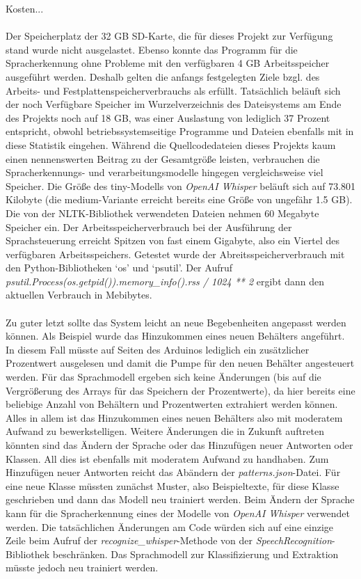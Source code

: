 Kosten...\\\\
Der Speicherplatz der 32 \ac{GB} SD-Karte, die für dieses Projekt zur Verfügung stand wurde nicht ausgelastet. Ebenso konnte das Programm für die Spracherkennung ohne Probleme mit den verfügbaren 4 \ac{GB} Arbeitsspeicher ausgeführt werden. Deshalb gelten die anfangs festgelegten Ziele bzgl. des Arbeits- und Festplattenspeicherverbrauchs als erfüllt. Tatsächlich beläuft sich der noch Verfügbare Speicher im Wurzelverzeichnis des Dateisystems am Ende des Projekts noch auf 18 \ac{GB}, was einer Auslastung von lediglich 37 Prozent entspricht, obwohl betriebssystemseitige Programme und Dateien ebenfalls mit in diese Statistik eingehen. Während die Quellcodedateien dieses Projekts kaum einen nennenswerten Beitrag zu der Gesamtgröße leisten, verbrauchen die Spracherkennungs- und verarbeitungsmodelle hingegen vergleichsweise viel Speicher. Die Größe des \glqq{}tiny\grqq{}-Modells von \textit{OpenAI Whisper} beläuft sich auf 73.801 Kilobyte (die \glqq{}medium\grqq{}-Variante erreicht bereits eine Größe von ungefähr 1.5 \ac{GB}). Die von der \ac{NLTK}-Bibliothek verwendeten Dateien nehmen 60 Megabyte Speicher ein. Der Arbeitsspeicherverbrauch bei der Ausführung der Sprachsteuerung erreicht Spitzen von fast einem Gigabyte, also ein Viertel des verfügbaren Arbeitsspeichers. Getestet wurde der Abreitsspeicherverbrauch mit den Python-Bibliotheken `os' und `psutil'. Der Aufruf \textit{psutil.Process(os.getpid()).memory\_info().rss / 1024 ** 2} ergibt dann den aktuellen Verbrauch in Mebibytes.\\\\
Zu guter letzt sollte das System leicht an neue Begebenheiten angepasst werden können. Als Beispiel wurde das Hinzukommen eines neuen Behälters angeführt. In diesem Fall müsste auf Seiten des Arduinos lediglich ein zusätzlicher Prozentwert ausgelesen und damit die Pumpe für den neuen Behälter angesteuert werden. Für das Sprachmodell ergeben sich keine Änderungen (bis auf die Vergrößerung des Arrays für das Speichern der Prozentwerte), da hier bereits eine beliebige Anzahl von Behältern und Prozentwerten extrahiert werden können. Alles in allem ist das Hinzukommen eines neuen Behälters also mit moderatem Aufwand zu bewerkstelligen. Weitere Änderungen die in Zukunft auftreten könnten sind das Ändern der Sprache oder das Hinzufügen neuer Antworten oder Klassen. All dies ist ebenfalls mit moderatem Aufwand zu handhaben. Zum Hinzufügen neuer Antworten reicht das Abändern der \textit{patterns.json}-Datei. Für eine neue Klasse müssten zunächst Muster, also Beispieltexte, für diese Klasse geschrieben und dann das Modell neu trainiert werden. Beim Ändern der Sprache kann für die Spracherkennung eines der Modelle von \textit{OpenAI Whisper} verwendet werden. Die tatsächlichen Änderungen am Code würden sich auf eine einzige Zeile beim Aufruf der \textit{recognize\_whisper}-Methode von der \textit{SpeechRecognition}-Bibliothek beschränken. Das Sprachmodell zur Klassifizierung und Extraktion müsste jedoch neu trainiert werden.
